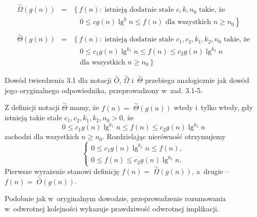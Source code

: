 
\subsubsection{} %
\begin{eqnarray*}
	\stackrel{\sim}{\Omega}\!\!(g(n)) &=& \left\{f(n):\;\mbox{istnieją dodatnie stałe }c,k,n_0\mbox{ takie, że}\right. \\
	&& \quad 0\le cg(n)\lg^kn\le f(n)\mbox{ dla wszystkich }n\ge n_0\left.\right\} \\\\
	\stackrel{\sim}{\Theta}\!\!(g(n)) &=& \left\{f(n):\;\mbox{istnieją dodatnie stałe }c_1,c_2,k_1,k_2,n_0\mbox{ takie, że}\right. \\
	&& \quad 0\le c_1g(n)\lg^{k_1}n\le f(n)\le c_2g(n)\lg^{k_2}n \\
	&& \left.\quad\mbox{dla wszystkich }n\ge n_0\right\}
\end{eqnarray*}

Dowód twierdzenia 3.1 dla notacji $\stackrel{\sim}{O}$, $\stackrel{\sim}{\Omega}$ i~$\stackrel{\sim}{\Theta}$ przebiega analogicznie jak dowód jego oryginalnego odpowiednika, przeprowadzony w~zad. 3.1-5.

Z definicji notacji $\stackrel{\sim}{\Theta}$ mamy, że $f(n)=\;\stackrel{\sim}{\Theta}\!\!(g(n))$ wtedy i~tylko wtedy, gdy istnieją takie stałe $c_1,c_2,k_1,k_2,n_0>0$, że
\[
	0\le c_1g(n)\lg^{k_1}n\le f(n)\le c_2g(n)\lg^{k_2}n
\]
zachodzi dla wszystkich $n\ge n_0$. Rozdzielając nierówność otrzymujemy
\[
	\left\{\begin{array}{c}
		0\le c_1g(n)\lg^{k_1}n\le f(n), \\
		0\le f(n)\le c_2g(n)\lg^{k_2}n.
	\end{array}\right.
\]
Pierwsze wyrażenie stanowi definicję $f(n)=\;\stackrel{\sim}{\Omega}\!\!(g(n))$, a~drugie -- $f(n)=\;\stackrel{\sim}{O}\!\!(g(n))$.

Podobnie jak w~oryginalnym dowodzie, przeprowadzenie rozumowania w~odwrotnej kolejności wykazuje prawdziwość odwrotnej implikacji.

\subsection{} %

